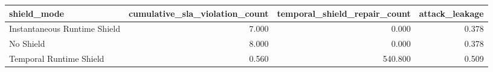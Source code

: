 \begin{tabular}{lrrr}
\toprule
shield_mode & cumulative_sla_violation_count & temporal_shield_repair_count & attack_leakage \\
\midrule
Instantaneous Runtime Shield & 7.000 & 0.000 & 0.378 \\
No Shield & 8.000 & 0.000 & 0.378 \\
Temporal Runtime Shield & 0.560 & 540.800 & 0.509 \\
\bottomrule
\end{tabular}

